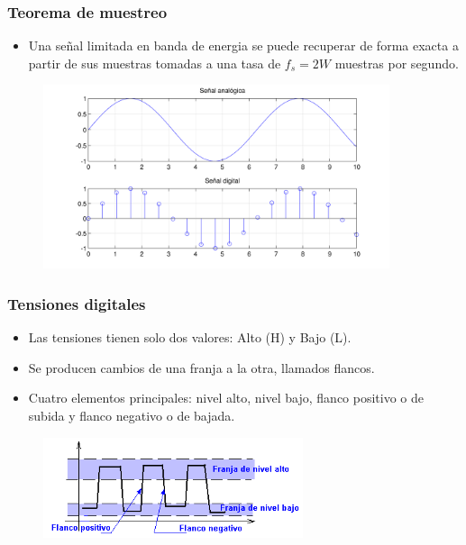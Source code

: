 \documentclass{beamer}
\begin{document}
\begin{frame}
\frametitle{Teorema de muestreo}

\begin{itemize}
\item Una señal limitada en banda de energia se puede recuperar de forma exacta a partir de sus muestras tomadas a una tasa de $f_{s}=2W$ muestras por segundo.
\end{itemize}

\begin{figure}[!h]
\centering
\includegraphics[width=4in]{muestreo}
\end{figure}

\end{frame}

\begin{frame}
\frametitle{Tensiones digitales}

\begin{itemize}
\item Las tensiones tienen solo dos valores: Alto (H) y Bajo (L).
\item Se producen cambios de una franja a la otra, llamados flancos.
\item Cuatro elementos principales: nivel alto, nivel bajo, flanco positivo o de subida y flanco negativo o de bajada.
\end{itemize}

\begin{figure}[!h]
\centering
\includegraphics[width=3in]{tensionesd}
\end{figure}

\end{frame}
\end{document}
